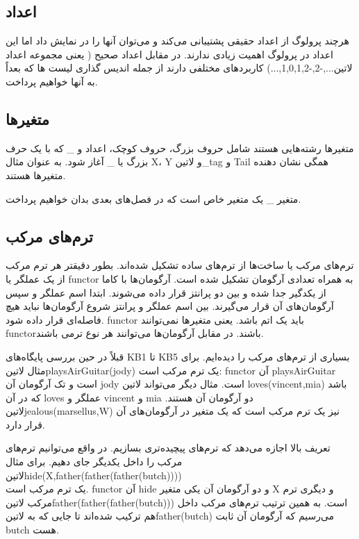 \subsection{اعداد}

هرچند پرولوگ از اعداد حقیقی پشتیبانی می‌کند و می‌توان آنها را در نمایش داد اما این اعداد در پرولوگ اهمیت زیادی ندارند. در مقابل اعداد صحیح ( یعنی مجموعه اعداد ‌لاتین{...,-2,-1,0,1,2,...}) کاربردهای مختلفی دارند از جمله اندیس گذاری لیست ها که بعداً به آنها خواهیم پرداخت.

\subsection{متغیرها}

متغیرها رشته‌هایی هستند شامل حروف بزرگ، حروف کوچک، اعداد و \_ که با یک حرف بزرگ یا \_ آغاز شود. به عنوان مثال X‌، Y و ‌لاتین{\_tag} و Tail همگی نشان دهنده متغیرها هستند.

متغیر \_ یک متغیر خاص است که در فصل‌های بعدی بدان خواهیم پرداخت.

\subsection{ترم‌های مرکب}

ترم‌های مرکب یا ساخت‌ها از ترم‌های ساده تشکیل شده‌اند. بطور دقیقتر هر ترم مرکب از یک عملگر یا functor به همراه تعدادی آرگومان تشکیل شده است. آرگومان‌ها با کاما از یکدگیر جدا شده و بین دو پرانتز قرار داده می‌شوند. ابتدا اسم عملگر و سپس آرگومان‌های آن قرار می‌گیرند. بین اسم عملگر و پرانتز شروع آرگومان‌ها نباید هیچ فاصله‌ای قرار داده شود. functor باید یک اتم باشد. یعنی متغیرها نمی‌توانند functorباشند. در مقابل آرگومان‌ها می‌توانند هر نوع ترمی باشند.

قبلاً در حین بررسی پایگاه‌های KB1 تا KB5 بسیاری از ترم‌های مرکب را دیده‌ایم. برای مثال ‌لاتین{playsAirGuitar(jody)} یک ترم مرکب است: functor آن playsAirGuitar  است و تک آرگومان آن jody است. مثال دیگر می‌تواند ‌لاتین{ loves(vincent,mia)} باشد که در آن loves عملگر و vincent و mia دو آرگومان آن هستند. ‌لاتین{jealous(marsellus,W)} نیز یک ترم مرکب است که یک متغیر در آرگومان‌های آن قرار دارد.

تعریف بالا اجازه می‌دهد که ترم‌های پیچیده‌تری بسازیم. در واقع می‌توانیم ترم‌های مرکب را داخل یکدیگر جای دهیم. برای مثال\\ ‌لاتین{hide(X,father(father(father(butch))))}\\ یک ترم مرکب است. functor آن hide و دو آرگومان آن یکی متغیر X و دیگری ترم مرکب ‌لاتین{father(father(father(butch)))} است. به همین ترتیب ترم‌های مرکب داخل هم ترکیب شده‌اند تا جایی که به ‌لاتین{father(butch)} می‌رسیم که آرگومان آن ثابت butch هست.

